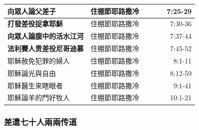 \begin{table}[H]
\begin{tabular}{p{13.07em}|l|l|l|p{5.285em}|r}
\textbf{向眾人論父差子} & \multicolumn{1}{p{7.93em}|}{住棚節耶路撒冷} &       &       & \multicolumn{1}{r|}{} & \multicolumn{1}{p{4.855em}}{7:25-29} \\\midrule

\textbf{打發差役捉拿耶穌} & \multicolumn{1}{p{7.93em}|}{住棚節耶路撒冷} &       &       & \multicolumn{1}{r|}{} & \multicolumn{1}{p{4.855em}}{7:30-36} \\\midrule

\textbf{向眾人論腹中的活水江河} & \multicolumn{1}{p{7.93em}|}{住棚節耶路撒冷} &       &       & \multicolumn{1}{r|}{} & \multicolumn{1}{p{4.855em}}{7:37-44} \\\midrule
\textbf{法利賽人责差役尼哥迪慕} & \multicolumn{1}{p{7.93em}|}{住棚節耶路撒冷} &       &       & \multicolumn{1}{r|}{} & \multicolumn{1}{p{4.855em}}{7:45-52} \\\midrule
    耶穌赦免犯罪的婦人 & \multicolumn{1}{p{7.93em}|}{住棚節耶路撒冷} &       &       & \multicolumn{1}{r|}{} & \multicolumn{1}{p{4.855em}}{8:1-11} \\ \midrule
    耶穌論光與自由 & \multicolumn{1}{p{7.93em}|}{住棚節耶路撒冷} &       &       & \multicolumn{1}{r|}{} & \multicolumn{1}{p{4.855em}}{8:12-59} \\\midrule
    耶穌醫生來瞎眼者 & \multicolumn{1}{p{7.93em}|}{住棚節耶路撒冷} &       &       & \multicolumn{1}{r|}{} & \multicolumn{1}{p{4.855em}}{9:1-41} \\ \midrule
    耶穌論羊的門好牧人 & \multicolumn{1}{p{7.93em}|}{住棚節耶路撒冷} &       &       & \multicolumn{1}{r|}{} & \multicolumn{1}{p{4.855em}}{10:1-21} \\\midrule
   
\end{tabular}%
\end{table}%

\subsubsection{差遣七十人兩兩传道}

